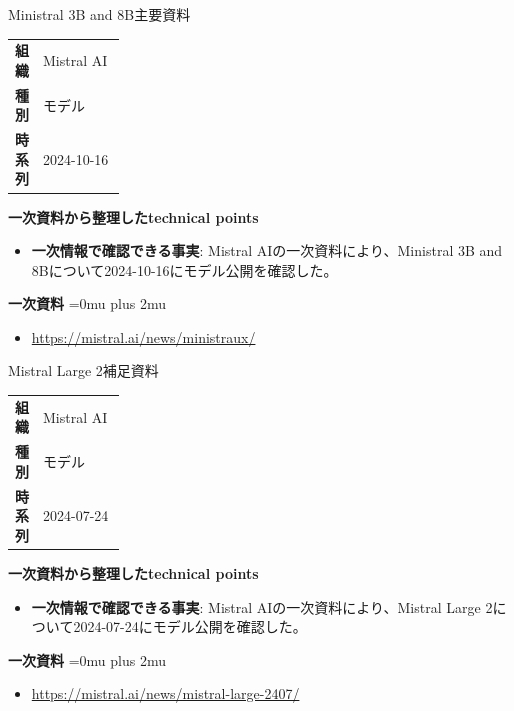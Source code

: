 \begin{technicalnote}{Ministral 3B and 8B}{主要資料}
\begingroup
\begin{tabularx}{\linewidth}{@{}>{\bfseries}p{0.22\linewidth}X@{}}
組織 & Mistral AI \\
種別 & モデル \\
時系列 & 2024-10-16 \\
\end{tabularx}
\smallskip
{\bfseries 一次資料から整理したtechnical points}
\begin{itemize}[leftmargin=1.5em,itemsep=0.35em]
\item \textbf{一次情報で確認できる事実}: Mistral AIの一次資料により、Ministral 3B and 8Bについて2024-10-16にモデル公開を確認した。
\end{itemize}
\begin{minipage}{\linewidth}
\begin{samepage}
{\bfseries 一次資料}
\begingroup\sloppy
\Urlmuskip=0mu plus 2mu\relax
\begin{itemize}[leftmargin=1.5em,itemsep=0.25em]
\item {\scriptsize\url{https://mistral.ai/news/ministraux/}}
\end{itemize}
\endgroup
\end{samepage}
\end{minipage}
\endgroup
\end{technicalnote}
\medskip

\begin{technicalnote}{Mistral Large 2}{補足資料}
\begingroup
\begin{tabularx}{\linewidth}{@{}>{\bfseries}p{0.22\linewidth}X@{}}
組織 & Mistral AI \\
種別 & モデル \\
時系列 & 2024-07-24 \\
\end{tabularx}
\smallskip
{\bfseries 一次資料から整理したtechnical points}
\begin{itemize}[leftmargin=1.5em,itemsep=0.35em]
\item \textbf{一次情報で確認できる事実}: Mistral AIの一次資料により、Mistral Large 2について2024-07-24にモデル公開を確認した。
\end{itemize}
\begin{minipage}{\linewidth}
\begin{samepage}
{\bfseries 一次資料}
\begingroup\sloppy
\Urlmuskip=0mu plus 2mu\relax
\begin{itemize}[leftmargin=1.5em,itemsep=0.25em]
\item {\scriptsize\url{https://mistral.ai/news/mistral-large-2407/}}
\end{itemize}
\endgroup
\end{samepage}
\end{minipage}
\endgroup
\end{technicalnote}
\medskip

